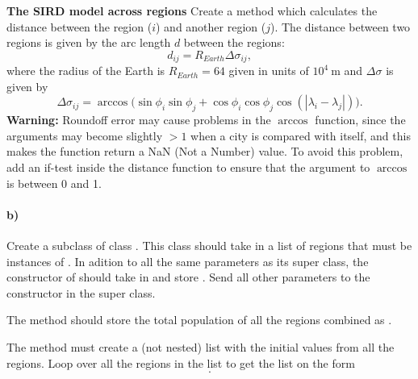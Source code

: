 \begin{Problem}{\textbf{The SIRD model across regions}}
Create a method  which calculates the distance between the  region ($i$) and another region ($j$). The distance between two regions is given by the arc length $d$ between the regions:
\begin{equation*}
    d_{i j} = R_{Earth} \Delta \sigma_{i j} ,
\end{equation*}
where the radius of the Earth is $R_{Earth} = 64$ given in units of $10^4 \ \mathrm{m}$ and $\Delta \sigma$ is given by
\begin{equation*}
    \Delta \sigma_{i j} = \arccos \big(
        \sin \phi_i \sin \phi_j
        +  \cos \phi_i \cos \phi_j
        \cos \left(
                |\lambda_i - \lambda_j |
        \right)
    \big)  .
\end{equation*}
{\bf Warning:} Roundoff error may cause problems in the $\arccos$ function, since the arguments may become slightly $>1$ when a city is compared with itself, and this makes the function return a
NaN (Not a Number) value. To avoid this problem, add an if-test inside the distance function to
ensure that the argument to $\arccos$ is between 0 and 1.

\paragraph{b)}
Create a subclass  of class . This class should take in a list of regions that must be instances of . In adition to all the same parameters as its super class, the constructor of   should take in and store . Send all other parameters to the constructor in the super class.

The method  should store the total population of all the regions combined as .

The method  must create a (not nested) list   with the initial values from all the regions. Loop over all the regions in the list  to get the list on the form
\begin{equation*}
    [ S_1(0), I_1(0), R_1(0), D_1(0), S_2(0), I_2(0), R_2(0), D_2(0), ..., D_M(0) ] .
\end{equation*}


\end{Problem}
